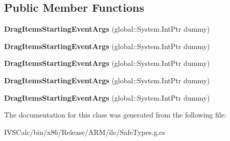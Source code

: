 \subsection*{Public Member Functions}
\begin{DoxyCompactItemize}
\item 
\mbox{\label{class_windows_1_1_u_i_1_1_xaml_1_1_controls_1_1_drag_items_starting_event_args_ab0c9a64b363abf7d1fce5c2fa9f5aa7c}} 
{\bfseries Drag\+Items\+Starting\+Event\+Args} (global\+::\+System.\+Int\+Ptr dummy)
\item 
\mbox{\label{class_windows_1_1_u_i_1_1_xaml_1_1_controls_1_1_drag_items_starting_event_args_ab0c9a64b363abf7d1fce5c2fa9f5aa7c}} 
{\bfseries Drag\+Items\+Starting\+Event\+Args} (global\+::\+System.\+Int\+Ptr dummy)
\item 
\mbox{\label{class_windows_1_1_u_i_1_1_xaml_1_1_controls_1_1_drag_items_starting_event_args_ab0c9a64b363abf7d1fce5c2fa9f5aa7c}} 
{\bfseries Drag\+Items\+Starting\+Event\+Args} (global\+::\+System.\+Int\+Ptr dummy)
\item 
\mbox{\label{class_windows_1_1_u_i_1_1_xaml_1_1_controls_1_1_drag_items_starting_event_args_ab0c9a64b363abf7d1fce5c2fa9f5aa7c}} 
{\bfseries Drag\+Items\+Starting\+Event\+Args} (global\+::\+System.\+Int\+Ptr dummy)
\item 
\mbox{\label{class_windows_1_1_u_i_1_1_xaml_1_1_controls_1_1_drag_items_starting_event_args_ab0c9a64b363abf7d1fce5c2fa9f5aa7c}} 
{\bfseries Drag\+Items\+Starting\+Event\+Args} (global\+::\+System.\+Int\+Ptr dummy)
\end{DoxyCompactItemize}


The documentation for this class was generated from the following file\+:\begin{DoxyCompactItemize}
\item 
I\+V\+S\+Calc/bin/x86/\+Release/\+A\+R\+M/ilc/Safe\+Types.\+g.\+cs\end{DoxyCompactItemize}
